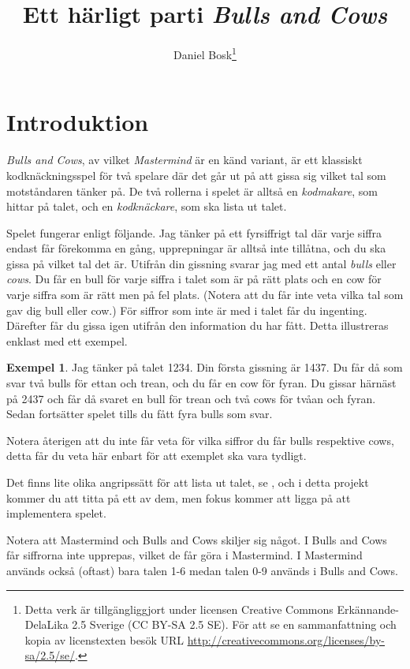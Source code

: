 \documentclass[a4paper]{miunasgn}
\title{Ett härligt parti \emph{Bulls and Cows}}
\author{Daniel Bosk\footnote{%
	Detta verk är tillgängliggjort under licensen Creative Commons 
	Erkännande-DelaLika 2.5 Sverige (CC BY-SA 2.5 SE).
	För att se en sammanfattning och kopia av licenstexten besök URL 
	\url{http://creativecommons.org/licenses/by-sa/2.5/se/}.
}}
\date{\svnId}
\theoremstyle{definition}
\newtheorem{example}{Exempel}
\begin{document}
\maketitle
\thispagestyle{foot}
\tableofcontents


\section{Introduktion}
\noindent
\emph{Bulls and Cows}, av vilket \emph{Mastermind} är en känd variant, är ett 
klassiskt kodknäckningsspel för två spelare där det går ut på att gissa sig 
vilket tal som motståndaren tänker på.
De två rollerna i spelet är alltså en \emph{kodmakare}, som hittar på talet, 
och en \emph{kodknäckare}, som ska lista ut talet.

Spelet fungerar enligt följande.
Jag tänker på ett fyrsiffrigt tal där varje siffra endast får förekomma en 
gång, upprepningar är alltså inte tillåtna, och du ska gissa på vilket tal det 
är.
Utifrån din gissning svarar jag med ett antal \emph{bulls} eller \emph{cows}.
Du får en bull för varje siffra i talet som är på rätt plats och en cow för 
varje siffra som är rätt men på fel plats.
(Notera att du får inte veta vilka tal som gav dig bull eller cow.)
För siffror som inte är med i talet får du ingenting.
Därefter får du gissa igen utifrån den information du har fått.
Detta illustreras enklast med ett exempel.

\begin{example}\label{ex:BullCow}
	Jag tänker på talet 1234.
	Din första gissning är 1437.
  Du får då som svar två bulls för ettan och trean, och du får en
  cow för fyran.
  Du gissar härnäst på 2437 och får då svaret en bull för trean och två cows 
  för tvåan och fyran.
  Sedan fortsätter spelet tills du fått fyra bulls som svar.
\end{example}

Notera återigen att du inte får veta för vilka siffror du får bulls respektive 
cows, detta får du veta här enbart för att exemplet ska vara tydligt.

Det finns lite olika angripssätt för att lista ut talet, se 
, och i detta projekt kommer du att titta på ett av dem, 
men fokus kommer att ligga på att implementera spelet.

Notera att Mastermind och Bulls and Cows skiljer sig något.
I Bulls and Cows får siffrorna inte upprepas, vilket de får göra i Mastermind.
I Mastermind används också (oftast) bara talen 1-6 medan talen 0-9 används 
i Bulls and Cows.
\end{document}
